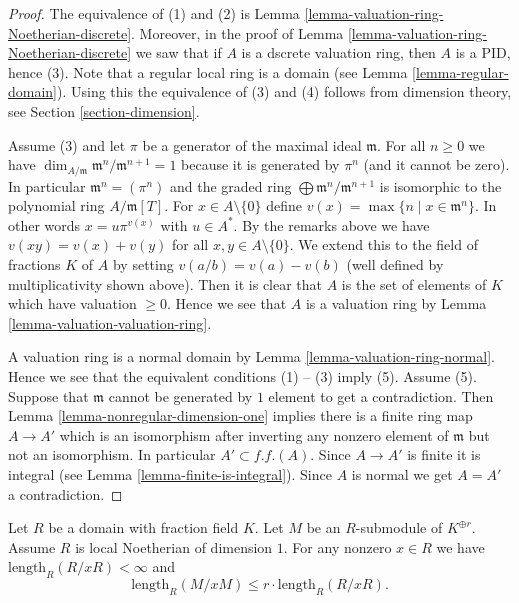 \begin{proof}
The equivalence of (1) and (2) is
Lemma \ref{lemma-valuation-ring-Noetherian-discrete}.
Moreover, in the proof of Lemma \ref{lemma-valuation-ring-Noetherian-discrete}
we saw that if $A$ is a dscrete valuation ring, then $A$ is a PID, hence (3).
Note that a regular local ring is a domain (see
Lemma \ref{lemma-regular-domain}). Using this the equivalence of (3) and (4)
follows from dimension theory, see Section \ref{section-dimension}.

\medskip\noindent
Assume (3) and let $\pi$ be a generator of the maximal ideal $\mathfrak m$.
For all $n \geq 0$ we have
$\dim_{A/\mathfrak m} \mathfrak m^n/\mathfrak m^{n + 1} = 1$
because it is generated by $\pi^n$ (and it cannot be zero).
In particular $\mathfrak m^n = (\pi^n)$ and
the graded ring $\bigoplus \mathfrak m^n/\mathfrak m^{n + 1}$
is isomorphic to the polynomial ring $A/\mathfrak m[T]$.
For $x \in A \setminus \{0\}$ define
$v(x) = \max\{n \mid x \in \mathfrak m^n\}$.
In other words $x = u \pi^{v(x)}$ with $u \in A^*$.
By the remarks above we have $v(xy) = v(x) + v(y)$
for all $x, y \in A \setminus \{0\}$. We extend this to the field of fractions
$K$ of $A$ by setting $v(a/b) = v(a) - v(b)$ (well defined by multiplicativity
shown above). Then it is clear that $A$ is the set of elements of
$K$ which have valuation $\geq 0$. Hence we see that $A$ is a
valuation ring by Lemma \ref{lemma-valuation-valuation-ring}.

\medskip\noindent
A valuation ring is a normal domain by Lemma \ref{lemma-valuation-ring-normal}.
Hence we see that the equivalent conditions (1) -- (3) imply
(5). Assume (5). Suppose that $\mathfrak m$ cannot be generated
by $1$ element to get a contradiction.
Then Lemma \ref{lemma-nonregular-dimension-one} implies there is a finite
ring map $A \to A'$ which is an isomorphism after inverting
any nonzero element of $\mathfrak m$ but not an isomorphism.
In particular $A' \subset f.f.(A)$.
Since $A \to A'$ is finite it is integral (see
Lemma \ref{lemma-finite-is-integral}).
Since $A$ is normal we get $A = A'$ a contradiction.
\end{proof}

\begin{lemma}
\label{lemma-finite-length}
Let $R$ be a domain with fraction field $K$.
Let $M$ be an $R$-submodule of $K^{\oplus r}$.
Assume $R$ is local Noetherian of dimension $1$.
For any nonzero $x \in R$ we have $\text{length}_R(R/xR) < \infty$
and
$$
\text{length}_R(M/xM) \leq r \cdot \text{length}_R(R/xR).
$$
\end{lemma}

